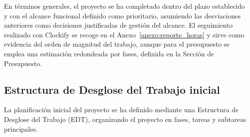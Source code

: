 En términos generales, el proyecto se ha completado dentro del plazo establecido y con el alcance funcional definido como prioritario, asumiendo las desviaciones anteriores como decisiones justificadas de gestión del alcance. El seguimiento realizado con Clockify se recoge en el Anexo~\ref{anexo:reporte_horas} y sirve como evidencia del orden de magnitud del trabajo, aunque para el presupuesto se emplea una estimación redondeada por fases, definida en la Sección de Presupuesto.

\subsection{Estructura de Desglose del Trabajo inicial}

La planificación inicial del proyecto se ha definido mediante una Estructura de Desglose del Trabajo (EDT), organizando el proyecto en fases, tareas y subtareas principales.

